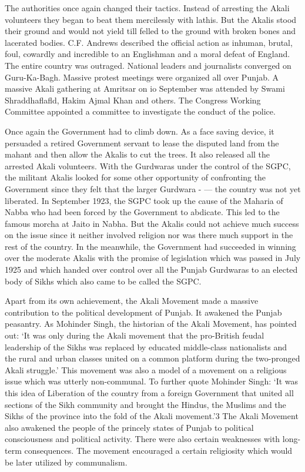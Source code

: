 \begin{multicols}{2}
The authorities once again changed their tactics. Instead of arresting the Akali volunteers they began to beat them mercilessly with lathis. But the Akalis stood their ground and would not yield till felled to the ground with broken bones and lacerated bodies. C.F. Andrews described the official action as inhuman, brutal, foul, cowardly and incredible to an Englishman and a moral defeat of England. The entire country was outraged. National leaders and journalists converged on Guru-Ka-Bagh. Massive protest meetings were organized all over Punjab. A massive Akali gathering at Amritsar on io September was attended by Swami Shraddhaflafld, Hakim Ajmal Khan and others. The Congress Working Committee appointed a committee to investigate the conduct of the police.

Once again the Government had to climb down. As a face saving device, it persuaded a retired Government servant to lease the disputed land from the mahant and then allow the Akalis to cut the trees. It also released all the arrested Akali volunteers. With the Gurdwaras under the control of the SGPC, the militant Akalis looked for some other opportunity of confronting the Government since they felt that the larger Gurdwara - --- the country was not yet liberated. In September 1923, the SGPC took up the cause of the Maharia of Nabba who had been forced by the Government to abdicate. This led to the famous morcha at Jaito in Nabha. But the Akalis could not achieve much success on the issue since it neither involved religion nor was there much support in the rest of the country. In the meanwhile, the Government had succeeded in winning over the moderate Akalis with the promise of legislation which was passed in July 1925 and which handed over control over all the Punjab Gurdwaras to an elected body of Sikhs which also came to be called the SGPC.

Apart from its own achievement, the Akali Movement made a massive contribution to the political development of Punjab. It awakened the Punjab peasantry. As Mohinder Singh, the historian of the Akali Movement, has pointed out: `It was only during the Akali movement that the pro-British feudal leadership of the Sikhs was replaced by educated middle-class nationalists and the rural and urban classes united on a common platform during the two-pronged Akali struggle.' This movement was also a model of a movement on a religious issue which was utterly non-communal. To further quote Mohinder Singh: `It was this idea of Liberation of the country from a foreign Government that united all sections of the Sikh community and brought the Hindus, the Muslims and the Sikhs of the province into the fold of the Akali movement.'3 The Akali Movement also awakened the people of the princely states of Punjab to political consciousness and political activity. There were also certain weaknesses with long-term consequences. The movement encouraged a certain religiosity which would be later utilized by communalism.


\end{multicols}

